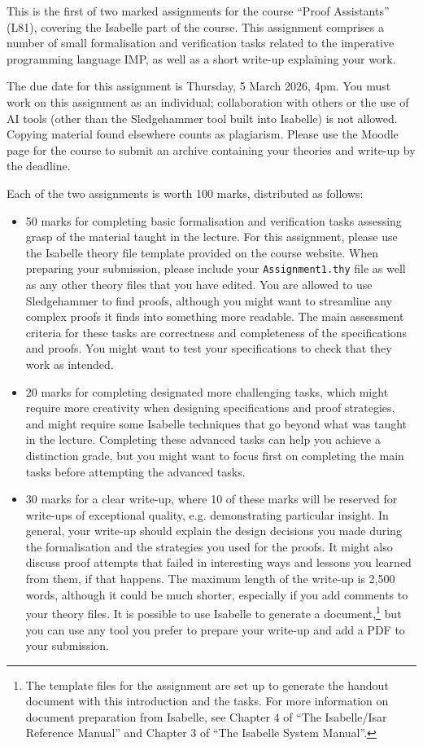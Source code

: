 This is the first of two marked assignments for the course ``Proof Assistants''
(L81), covering the Isabelle part of the course.  This assignment comprises
a number of small formalisation and verification tasks related to the imperative
programming language IMP, as well as a short write-up explaining your work.

The due date for this assignment is Thursday, 5 March 2026, 4pm. You must
work on this assignment as an individual;  collaboration with others or the use
of AI tools (other than the Sledgehammer tool built into Isabelle) is not
allowed. Copying material found elsewhere counts as plagiarism. Please use the
Moodle page for the course to submit an archive containing your theories and
write-up by the deadline.

Each of the two assignments is worth 100 marks, distributed as follows:
\begin{itemize}
  \item 50 marks for completing basic formalisation and verification tasks
    assessing grasp of the material taught in the lecture.  For this
    assignment, please use the Isabelle theory file template provided on the
    course website. When preparing your submission, please include your
    \verb|Assignment1.thy| file as well as any other theory files that you have
    edited.  You are allowed to use Sledgehammer to find proofs, although you
    might want to streamline any complex proofs it finds into something more
    readable.  The main assessment criteria for these tasks are correctness and
    completeness of the specifications and proofs.  You might want to test your
    specifications to check that they work as intended.
  \item 20 marks for completing designated more challenging tasks, which might
    require more creativity when designing specifications and proof strategies,
    and might require some Isabelle techniques that go beyond what was taught
    in the lecture. Completing these advanced tasks can help you achieve a
    distinction grade, but you might want to focus first on completing the main
    tasks before attempting the advanced tasks.
  \item 30 marks for a clear write-up, where 10 of these marks will be reserved
    for write-ups of exceptional quality, e.g. demonstrating particular
    insight. In general, your write-up should explain the design decisions you
    made during the formalisation and the strategies you used for the proofs.
    It might also discuss proof attempts that failed in interesting ways and
    lessons you learned from them, if that happens. The maximum length of the
    write-up is 2,500 words, although it could be much shorter, especially if
    you add comments to your theory files. It is possible to use Isabelle to
    generate a document,\footnote{The template files for the assignment are set
    up to generate the handout document with this introduction and the tasks.
    For more information on document preparation from Isabelle, see Chapter 4
    of ``The Isabelle/Isar Reference Manual'' and Chapter 3 of ``The Isabelle
    System Manual''.} but you can use any tool you prefer to prepare your
    write-up and add a PDF to your submission.
\end{itemize}
